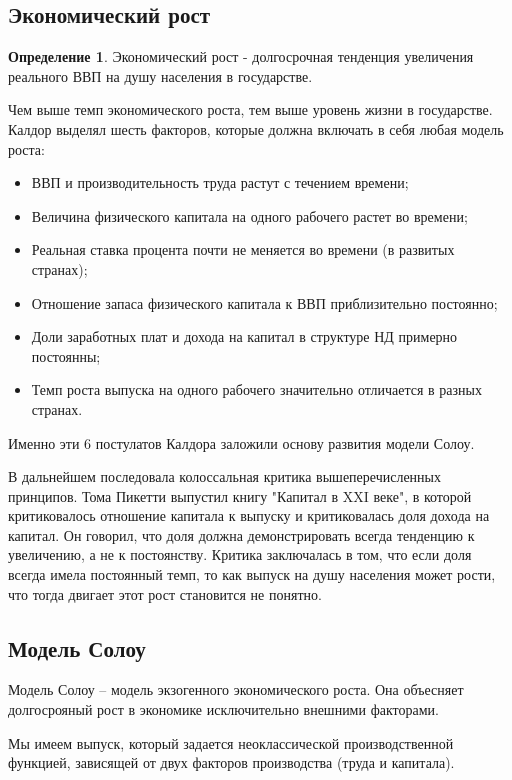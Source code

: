 \documentclass[reqno]{article}
\theoremstyle{definition}
\theoremstyle{definition}
\theoremstyle{definition}
\theoremstyle{definition}
\theoremstyle{definition}
\theoremstyle{definition}
\theoremstyle{definition}
\newtheorem*{defi}{Определение}
\theoremstyle{definition}
\theoremstyle{definition}
\begin{document}
		\subsection{Экономический рост}\label{sec:1.2}
		
		\begin{defi}
			Экономический рост - долгосрочная тенденция увеличения реального ВВП на душу населения в государстве.
		\end{defi}
		
		Чем выше темп экономического роста, тем выше уровень жизни в государстве. Калдор выделял шесть факторов, которые должна включать в себя любая модель роста:
		
		\begin{itemize}
			\item ВВП и производительность труда растут с течением времени;
			\item Величина физического капитала на одного рабочего растет во времени;
			\item Реальная ставка процента почти не меняется во времени (в развитых странах);
			\item Отношение запаса физического капитала к ВВП приблизительно постоянно;
			\item Доли заработных плат и дохода на капитал в структуре НД примерно постоянны;
			\item Темп роста выпуска на одного рабочего значительно отличается в разных странах.
		\end{itemize}
		
		Именно эти 6 постулатов Калдора заложили основу развития модели Солоу.
		
		В дальнейшем последовала колоссальная критика вышеперечисленных принципов. Тома Пикетти выпустил книгу "Капитал в XXI веке", в которой критиковалось отношение капитала к выпуску и критиковалась доля дохода на капитал. Он говорил, что доля должна демонстрировать всегда тенденцию к увеличению, а не к постоянству. Критика заключалась в том, что если доля всегда имела постоянный темп, то как выпуск на душу населения может рости, что тогда двигает этот рост становится не понятно.
		
		\subsection{Модель Солоу}
		Модель Солоу -- модель экзогенного экономического роста. Она объесняет долгосрояный рост в экономике исключительно внешними факторами.
		
		Мы имеем выпуск, который задается неоклассической производственной функцией, зависящей от двух факторов производства (труда и капитала). 
		
\end{document}
